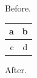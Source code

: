\documentclass{article}
\begin{document}
Before.
\begin{tabular}{r|c}
a & b \\ \hline
c & d \\
\end{tabular}
After.
\end{document}
